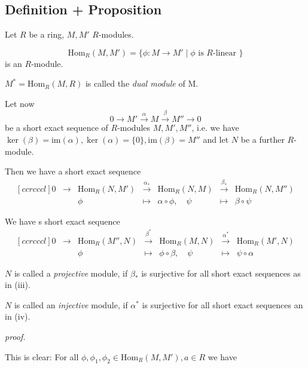 \documentclass[12pt]{book}
\begin{document}
\begin{spacing}{1.3}
\subsection{Definition + Proposition}%
Let $R$ be a ring, $M, M'$ $R$-modules.
\begin{compactenum}
\item $$\textrm{Hom}_R(M,M')=\{ \phi:M \longrightarrow M' \mid \phi \textrm{ is $R$-linear } \}$$
is an $R$-module.
\item $M^{*}=\textrm{Hom}_R(M,R)$ is called the \textit{dual module} of M.
\setcounter{temp}{\value{enumi}}
\end{compactenum}
Let now $$0 \longrightarrow M' \overset{\alpha}{\longrightarrow} M \overset{\beta}{\longrightarrow} M'' \longrightarrow 0$$
be a short exact sequence of $R$-modules $M,M',M''$, i.e. we have $\ker(\beta)=\textrm{im}(\alpha), \ker(\alpha)= \{0\}, \textrm{im}(\beta)=M''$ and let $N$ be a further $R$-module.
\begin{compactenum}
\setcounter{enumi}{\value{temp}}
\item Then we have a short exact sequence
$$\begin{matrix}[ccrcccl]0 &\longrightarrow& \textrm{Hom}_R(N,M')& \overset{\alpha_*}{\longrightarrow} &\textrm{Hom}_R(N,M)&\overset{\beta_*}{\longrightarrow} &\textrm{Hom}_R(N,M'') \\ && \phi & \mapsto & \alpha \circ \phi, \quad \psi & \mapsto & \beta \circ \psi \end{matrix}$$
\item We have s short exact sequence
$$\begin{matrix}[ccrcccl]0 & \longrightarrow & \textrm{Hom}_R(M'',N) & \overset{\beta^*}{\longrightarrow} & \textrm{Hom}_R(M,N) & \overset{\alpha^*}{\longrightarrow} & \textrm{Hom}_R(M',N) \\ && \phi & \mapsto & \phi \circ \beta, \quad \psi & \mapsto & \psi \circ \alpha \end{matrix}$$
\item $N$ is called a \textit{projective} module, if $\beta_*$ is surjective for all short exact sequences as in (iii).
\item $N$ is called an \textit{injective}  module, if $\alpha^*$ is surjective for all short exact sequences an in (iv).
\end{compactenum}
\textit{proof.}
\begin{compactenum}
\item This is clear: For all $ \phi, \phi_1, \phi_2 \in \textrm{Hom}_R(M,M'), a \in R$ we have

\end{compactenum}
\end{spacing}
\end{document}
